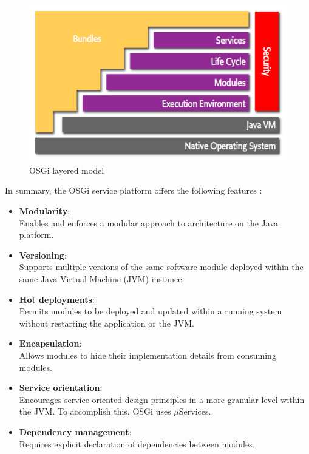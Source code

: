 \begin{figure}[H]
\centering
\includegraphics[width=\textwidth]{layering-osgi.png}
\caption{\gls{OSGi} layered model \cite{OSGi}}
\label{fig:layering-osgi}
\end{figure}

\newpage
In summary, the \gls{OSGi} service platform offers the following features \cite{Knoernschild:2012}:

\begin{itemize}
	\item \textbf{Modularity}: \\
	Enables and enforces a modular approach to architecture on the Java platform.
	\item \textbf{Versioning}: \\
	Supports multiple versions of the same software module deployed within the same Java Virtual Machine (JVM) instance.
	\item \textbf{Hot deployments}: \\
	Permits modules to be deployed and updated within a running system without restarting the application or the JVM.
	\item \textbf{Encapsulation}: \\
	Allows modules to hide their implementation details from consuming modules.
	\item \textbf{Service orientation}: \\
	Encourages service-oriented design principles in a more granular level within the JVM. To accomplish this, OSGi uses $\mu$Services.
	\item \textbf{Dependency management}: \\
	Requires explicit declaration of dependencies between modules.
\end{itemize}


